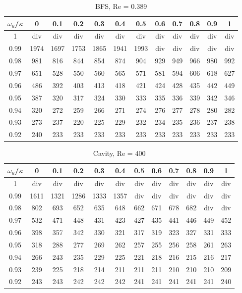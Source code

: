 \documentclass[final,3p,times,11pt,onecolumn]{myElsarticle}
\numberwithin{equation}{section}
\begin{document}
\begin{table}[t!]
\centering
\begin{tabular}{c|ccccccccccc}
\hline 
$\omega_u$/$\kappa$ & 0 & 0.1 & 0.2 & 0.3 & 0.4 & 0.5 & 0.6 & 0.7 & 0.8 & 0.9 & 1 \\ 
\hline 
1 & div & div & div & div & div & div & div & div & div & div & div \\ 
0.99 & 1974 & 1697 & 1753 & 1865 & 1941 & 1993 & div & div & div & div & div \\ 
0.98 & 981 & 816 & 844 & 854 & 874 & 904 & 929 & 949 & 966 & 980 & 992 \\ 
0.97 & 651 & 528 & 550 & 560 & 565 & 571 & 581 & 594 & 606 & 618 & 627 \\ 
0.96 & 486 & 392 & 403 & 413 & 418 & 421 & 424 & 428 & 435 & 442 & 449 \\ 
0.95 & 387 & 320 & 317 & 324 & 330 & 333 & 335 & 336 & 339 & 342 & 346 \\ 
0.94 & 320 & 272 & 259 & 266 & 271 & 274 & 276 & 277 & 278 & 280 & 282 \\ 
0.93 & 273 & 237 & 220 & 225 & 229 & 232 & 234 & 235 & 236 & 237 & 238 \\ 
0.92 & 240 & 233 & 233 & 233 & 233 & 233 & 233 & 233 & 233 & 233 & 233 \\ 
\hline 
\end{tabular}
\caption{BFS, Re = 0.389}
\label{Table:BFS_LowRe}
\end{table}

\begin{table}[t!]
\centering
\begin{tabular}{c|ccccccccccc}
\hline 
$\omega_u$/$\kappa$ & 0 & 0.1 & 0.2 & 0.3 & 0.4 & 0.5 & 0.6 & 0.7 & 0.8 & 0.9 & 1 \\ 
\hline 
1 & div & div & div & div & div & div & div & div & div & div & div \\ 
0.99 & 1611 & 1321 & 1286 & 1333 & 1357 & div & div & div & div & div & div \\ 
0.98 & 802 & 693 & 652 & 635 & 648 & 662 & 671 & 678 & 682 & div & div \\ 
0.97 & 532 & 471 & 448 & 431 & 423 & 427 & 435 & 441 & 446 & 449 & 452 \\ 
0.96 & 398 & 357 & 342 & 330 & 321 & 317 & 319 & 323 & 327 & 331 & 333 \\ 
0.95 & 318 & 288 & 277 & 269 & 262 & 257 & 255 & 256 & 258 & 261 & 263 \\ 
0.94 & 266 & 243 & 235 & 229 & 225 & 221 & 218 & 216 & 215 & 216 & 217 \\ 
0.93 & 239 & 225 & 218 & 214 & 211 & 211 & 211 & 210 & 210 & 210 & 209 \\ 
0.92 & 243 & 243 & 242 & 242 & 242 & 241 & 241 & 241 & 241 & 241 & 240 \\ 
\hline 
\end{tabular}
\caption{Cavity, Re = 400}
\label{Table:Cavity_HighRe}
\end{table}
\end{document}

